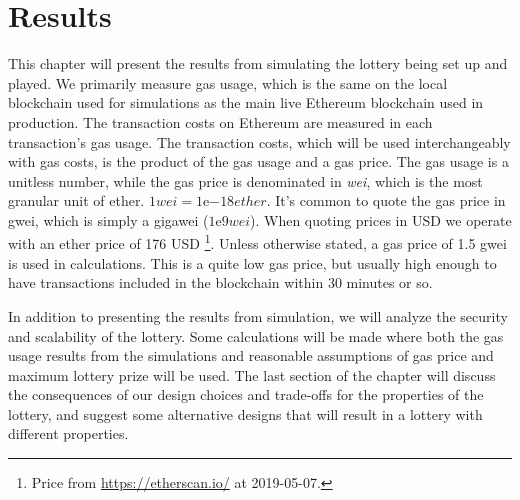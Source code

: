\chapter{Results}
\label{chap:results}

This chapter will present the results from simulating the lottery being set up and played. We primarily measure gas usage, which is the same on the local blockchain used for simulations as the main live Ethereum blockchain used in production. The transaction costs on Ethereum are measured in each transaction's gas usage. The transaction costs, which will be used interchangeably with gas costs, is the product of the gas usage and a gas price. The gas usage is a unitless number, while the gas price is denominated in \emph{wei}, which is the most granular unit of ether. $1 wei=1 \mathrm{e}{-18} ether$. It's common to quote the gas price in gwei, which is simply a gigawei ($1\mathrm{e}{9} wei$). When quoting prices in USD we operate with an ether price of 176 USD \footnote{Price from \url{https://etherscan.io/} at 2019-05-07.}. Unless otherwise stated, a gas price of 1.5 gwei is used in calculations. This is a quite low gas price, but usually high enough to have transactions included in the blockchain within 30 minutes or so.

In addition to presenting the results from simulation, we will analyze the security and scalability of the lottery. Some calculations will be made where both the gas usage results from the simulations and reasonable assumptions of gas price and maximum lottery prize will be used.
The last section of the chapter will discuss the consequences of our design choices and trade-offs for the properties of the lottery, and suggest some alternative designs that will result in a lottery with different properties.








